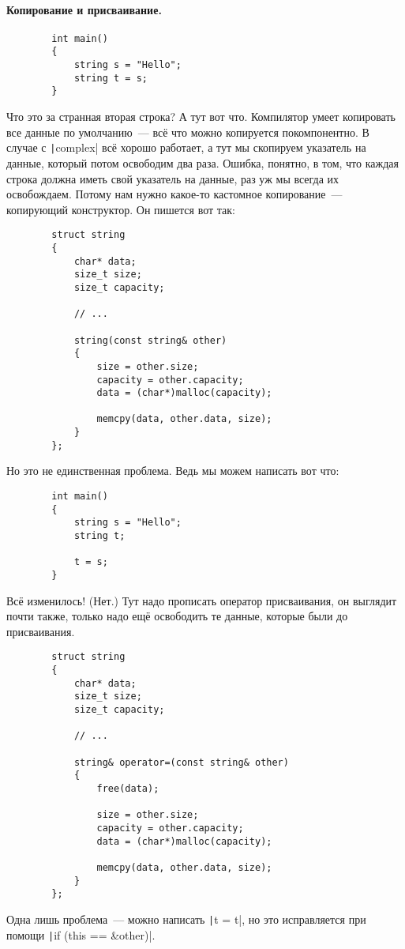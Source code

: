 \documentclass{article}
\begin{document}
    \paragraph{Копирование и присваивание.}
    \begin{verbatim}
        int main()
        {
            string s = "Hello";
            string t = s;
        }
    \end{verbatim}
    Что это за странная вторая строка? А тут вот что. Компилятор умеет копировать все данные по умолчанию~--- всё что можно копируется покомпонентно. В случае с \texttt|complex| всё хорошо работает, а тут мы скопируем указатель на данные, который потом освободим два раза. Ошибка, понятно, в том, что каждая строка должна иметь свой указатель на данные, раз уж мы всегда их освобождаем. Потому нам нужно какое-то кастомное копирование~--- копирующий конструктор. Он пишется вот так:
    \begin{verbatim}
        struct string
        {
            char* data;
            size_t size;
            size_t capacity;

            // ...

            string(const string& other)
            {
                size = other.size;
                capacity = other.capacity;
                data = (char*)malloc(capacity);

                memcpy(data, other.data, size);
            }
        };
    \end{verbatim}
    Но это не единственная проблема. Ведь мы можем написать вот что:
    \begin{verbatim}
        int main()
        {
            string s = "Hello";
            string t;

            t = s;
        }
    \end{verbatim}
    Всё изменилось! (Нет.) Тут надо прописать оператор присваивания, он выглядит почти также, только надо ещё освободить те данные, которые были до присваивания.
    \begin{verbatim}
        struct string
        {
            char* data;
            size_t size;
            size_t capacity;
            
            // ...
            
            string& operator=(const string& other)
            {
                free(data);

                size = other.size;
                capacity = other.capacity;
                data = (char*)malloc(capacity);
                
                memcpy(data, other.data, size);
            }
        };
    \end{verbatim}
    Одна лишь проблема~--- можно написать \texttt|t = t|, но это исправляется при помощи \texttt|if (this == &other)|.
\end{document}
